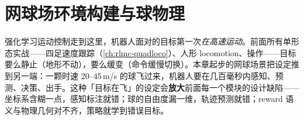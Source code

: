 \chapter{网球场环境构建与球物理}\label{ch:rlmc-tennisenv}


强化学习运动控制走到这里，机器人面对的目标第一次\emph{在高速运动}。前面所有单形态实战——四足速度跟踪（\cref{ch:rlmc-quadloco}）、人形 locomotion、操作——目标要么静止（地形不动），要么缓变（命令缓慢切换）。本章起步的网球场景把设定推到另一端：一颗时速 $20$--$45$\,m/s 的球飞过来，机器人要在几百毫秒内感知、预测、决策、出手。这种「目标在飞」的设定会\textbf{放大}前面每一个模块的设计缺陷——坐标系含糊一点，感知标注就错；球的自由度漏一维，轨迹预测就错；reward 语义与物理几何对不齐，策略就学到错误目标。

